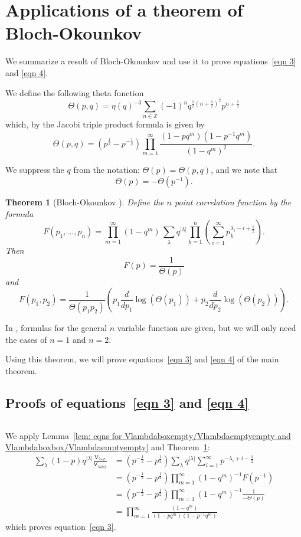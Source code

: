 \documentclass[12pt]{amsart}
\newcommand{\znums} {{\mathbb Z}}		%
\newcommand{\Vsf}{\mathsf{V}}
\newcommand{\bx}{\square}
\renewcommand{\emptyset}{\varnothing}
\newcommand{\half}{\frac{1}{2}}
\newtheorem{theorem}{Theorem}%
\theoremstyle{definition}
\begin{document}
\section{Applications of a theorem of Bloch-Okounkov}
\label{sec: applications of the Bloch-Okounkov thm}

We summarize a result of Bloch-Okounkov \cite{Bloch-Okounkov} and use
it to prove equations~\eqref{eqn 3} and \eqref{eqn 4}.

We define the following theta function
\[
\Theta (p,q) = \eta (q)^{-3}\sum_{n\in \znums}
(-1)^{n}q^{\half (n+\half )^{2}} p^{n+\half } 
\]
which, by the Jacobi triple product formula is given by
\[
\Theta (p,q) = (p^{\half} -p^{-\half})\prod_{m=1}^{\infty}
\frac{(1-pq^{m})(1-p^{-1}q^{m})}{(1-q^{m})^{2}}. 
\]

We suppress the $q$ from the notation: $\Theta (p) = \Theta (p,q)$, and
we note that
\[
\Theta (p) = -\Theta (p^{-1}).
\]

\begin{theorem}[Bloch-Okounkov \cite{Bloch-Okounkov}]\label{thm: Bloch-Okounkov thm}
Define the $n$ point correlation function by the formula
\[
F(p_{1},\dots ,p_{n}) = \prod_{m=1}^{\infty}(1-q^{m})\, \sum_{\lambda}
q^{|\lambda|} \prod_{k=1}^{n} \left(\sum_{i=1}^{\infty} p_{k}^{\lambda_{i}-i+\half } \right).
\]
Then
\[
F(p) = \frac{1}{\Theta (p)}
\]
and
\[
F(p_{1},p_{2}) = \frac{1}{\Theta
(p_{1}p_{2})}\left(p_{1}\frac{d}{dp_{1}}\log(\Theta (p_{1}))+ p_{2}\frac{d}{dp_{2}}\log(\Theta (p_{2})) \right).
\]
\end{theorem}

In \cite{Bloch-Okounkov}, formulas for the general $n$ variable
function are given, but we will only need the cases of $n=1$ and
$n=2$.

Using this theorem, we will prove equations~\eqref{eqn 3} and
\eqref{eqn 4} of the main theorem.

\subsection{Proofs of equations~\eqref{eqn 3} and \eqref{eqn
4}}\label{subsec: pfs of eqn 3 and 4} $\, $
    


We apply Lemma~\ref{lem: eqns for Vlambdaboxempty/Vlambdaemptyempty
and Vlambdaboxbox/Vlambdaemptyempty} and Theorem~\ref{thm: Bloch-Okounkov thm}:
\begin{align*}
\sum_{\lambda}(1-p) q^{|\lambda |} \frac{\Vsf_{\lambda \bx
\emptyset}}{\Vsf_{\lambda \emptyset \emptyset}} &=
(p^{-\half}-p^{\half}) \sum_{\lambda} q^{|\lambda |}\sum_{i=1}^{\infty}p^{-\lambda_{i}+i-\half}\\
&=(p^{-\half}-p^{\half}) \prod_{m=1}^{\infty}(1-q^{m})^{-1} F(p^{-1})\\
&=(p^{-\half}-p^{\half}) \prod_{m=1}^{\infty}(1-q^{m})^{-1} \frac{1}{-\Theta (p)}\\
&=\prod_{m=1}^{\infty} \frac{(1-q^{m})}{(1-pq^{m})(1-p^{-1}q^{m})}
\end{align*}
which proves equation~\eqref{eqn 3}.
\end{document}
